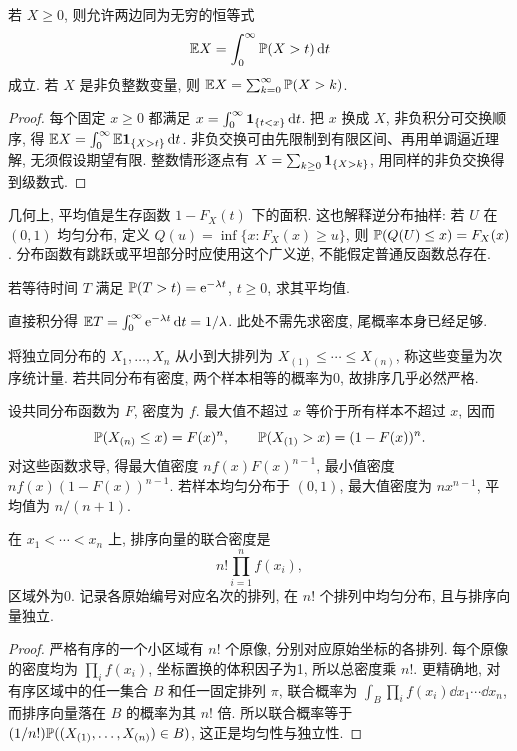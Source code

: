 \begin{theorem}[尾积分公式]
若 $X\ge0$, 则允许两边同为无穷的恒等式
\[\mathbb E X=\int_0^\infty\mathbb P(X>t)\,\mathrm d t\]
成立. 若 $X$ 是非负整数变量, 则 $\mathbb E X=\sum_{k=0}^\infty\mathbb P(X>k)$.
\end{theorem}
\begin{proof}
每个固定 $x\ge0$ 都满足 $x=\int_0^\infty\mathbf 1_{\{t<x\}}\,\mathrm d t$. 把 $x$ 换成 $X$, 非负积分可交换顺序, 得
$\mathbb E X=\int_0^\infty\mathbb E\mathbf 1_{\{X>t\}}\,\mathrm d t$. 非负交换可由先限制到有限区间、再用单调逼近理解, 无须假设期望有限. 整数情形逐点有 $X=\sum_{k\ge0}\mathbf 1_{\{X>k\}}$, 用同样的非负交换得到级数式.
\end{proof}
几何上, 平均值是生存函数 $1-F_X(t)$ 下的面积. 这也解释逆分布抽样: 若 $U$ 在 $(0,1)$ 均匀分布, 定义 $Q(u)=\inf\{x:F_X(x)\ge u\}$, 则 $\mathbb P(Q(U)\le x)=F_X(x)$. 分布函数有跳跃或平坦部分时应使用这个广义逆, 不能假定普通反函数总存在.
\begin{example}
若等待时间 $T$ 满足 $\mathbb P(T>t)=\mathrm e^{-\lambda t}$, $t\ge0$, 求其平均值.
\end{example}
\begin{solution}
直接积分得 $\mathbb E T=\int_0^\infty\mathrm e^{-\lambda t}\,\mathrm d t=1/\lambda$. 此处不需先求密度, 尾概率本身已经足够.
\end{solution}

\begin{definition}[次序统计量]
将独立同分布的 $X_1,\ldots,X_n$ 从小到大排列为 $X_{(1)}\le\cdots\le X_{(n)}$, 称这些变量为次序统计量. 若共同分布有密度, 两个样本相等的概率为0, 故排序几乎必然严格.
\end{definition}
设共同分布函数为 $F$, 密度为 $f$. 最大值不超过 $x$ 等价于所有样本不超过 $x$, 因而
\[\mathbb P(X_{(n)}\le x)=F(x)^n,\qquad
\mathbb P(X_{(1)}>x)=(1-F(x))^n.\]
对这些函数求导, 得最大值密度 $nf(x)F(x)^{n-1}$, 最小值密度 $nf(x)(1-F(x))^{n-1}$. 若样本均匀分布于 $(0,1)$, 最大值密度为 $nx^{n-1}$, 平均值为 $n/(n+1)$.

\begin{theorem}[联合排序密度与随机名次]
在 $x_1<\cdots<x_n$ 上, 排序向量的联合密度是
\[n!\prod_{i=1}^nf(x_i),\]
区域外为0. 记录各原始编号对应名次的排列, 在 $n!$ 个排列中均匀分布, 且与排序向量独立.
\end{theorem}
\begin{proof}
严格有序的一个小区域有 $n!$ 个原像, 分别对应原始坐标的各排列. 每个原像的密度均为 $\prod_i f(x_i)$, 坐标置换的体积因子为1, 所以总密度乘 $n!$. 更精确地, 对有序区域中的任一集合 $B$ 和任一固定排列 $\pi$, 联合概率为 $\int_B\prod_i f(x_i)\dd x_1\cdots\dd x_n$, 而排序向量落在 $B$ 的概率为其 $n!$ 倍. 所以联合概率等于 $(1/n!)\mathbb P((X_{(1)},\ldots,X_{(n)})\in B)$, 这正是均匀性与独立性.
\end{proof}

